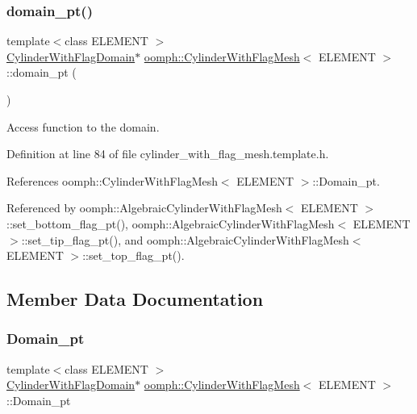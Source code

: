 \subsubsection{\texorpdfstring{domain\+\_\+pt()}{domain\_pt()}}
{\footnotesize\ttfamily template$<$class E\+L\+E\+M\+E\+NT $>$ \\
\hyperlink{classoomph_1_1CylinderWithFlagDomain}{Cylinder\+With\+Flag\+Domain}$\ast$ \hyperlink{classoomph_1_1CylinderWithFlagMesh}{oomph\+::\+Cylinder\+With\+Flag\+Mesh}$<$ E\+L\+E\+M\+E\+NT $>$\+::domain\+\_\+pt (\begin{DoxyParamCaption}{ }\end{DoxyParamCaption})\hspace{0.3cm}{\ttfamily [inline]}}



Access function to the domain. 



Definition at line 84 of file cylinder\+\_\+with\+\_\+flag\+\_\+mesh.\+template.\+h.



References oomph\+::\+Cylinder\+With\+Flag\+Mesh$<$ E\+L\+E\+M\+E\+N\+T $>$\+::\+Domain\+\_\+pt.



Referenced by oomph\+::\+Algebraic\+Cylinder\+With\+Flag\+Mesh$<$ E\+L\+E\+M\+E\+N\+T $>$\+::set\+\_\+bottom\+\_\+flag\+\_\+pt(), oomph\+::\+Algebraic\+Cylinder\+With\+Flag\+Mesh$<$ E\+L\+E\+M\+E\+N\+T $>$\+::set\+\_\+tip\+\_\+flag\+\_\+pt(), and oomph\+::\+Algebraic\+Cylinder\+With\+Flag\+Mesh$<$ E\+L\+E\+M\+E\+N\+T $>$\+::set\+\_\+top\+\_\+flag\+\_\+pt().



\subsection{Member Data Documentation}
\mbox{\label{classoomph_1_1CylinderWithFlagMesh_a257b36fed6fb0d20d108a27c6a1c5f86}} 
\subsubsection{\texorpdfstring{Domain\+\_\+pt}{Domain\_pt}}
{\footnotesize\ttfamily template$<$class E\+L\+E\+M\+E\+NT $>$ \\
\hyperlink{classoomph_1_1CylinderWithFlagDomain}{Cylinder\+With\+Flag\+Domain}$\ast$ \hyperlink{classoomph_1_1CylinderWithFlagMesh}{oomph\+::\+Cylinder\+With\+Flag\+Mesh}$<$ E\+L\+E\+M\+E\+NT $>$\+::Domain\+\_\+pt\hspace{0.3cm}{\ttfamily [protected]}}



